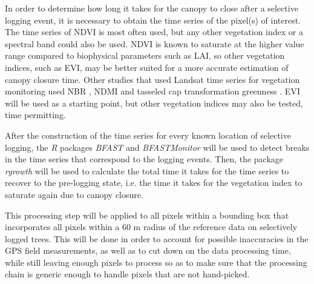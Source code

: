 \documentclass[a4paper,10pt]{article}
\begin{document}
In order to determine how long it takes for the canopy to close after a selective logging event, it is necessary to obtain the time series of the pixel(s) of interest. The time series of \ac{NDVI} is most often used, but any other vegetation index or a spectral band could also be used. \ac{NDVI} is known to saturate at the higher value range compared to biophysical parameters such as \ac{LAI}, so other vegetation indices, such as \ac{EVI}, may be better suited for a more accurate estimation of canopy closure time. Other studies that used Landsat time series for vegetation monitoring used \ac{NBR} \citep{schneibel_assessment_2017, shimizu_using_2017}, \ac{NDMI} \citep{dutrieux_reconstructing_2016} and tasseled cap transformation greenness \citep{powell_quantification_2010}. \ac{EVI} will be used as a starting point, but other vegetation indices may also be tested, time permitting.

After the construction of the time series for every known location of selective logging, the \textit{R} packages \textit{BFAST} \citep{verbesselt_detecting_2010} and \textit{BFASTMonitor} \citep{verbesselt_near_2012} will be used to detect breaks in the time series that correspond to the logging events. Then, the package \textit{rgrowth} \citep{devries_tracking_2015} will be used to calculate the total time it takes for the time series to recover to the pre-logging state, i.e. the time it takes for the vegetation index to saturate again due to canopy closure.

This processing step will be applied to all pixels within a bounding box that incorporates all pixels within a 60 m radius of the reference data on selectively logged trees. This will be done in order to account for possible inaccuracies in the GPS field measurements, as well as to cut down on the data processing time, while still leaving enough pixels to process so as to make sure that the processing chain is generic enough to handle pixels that are not hand-picked.
\end{document}
